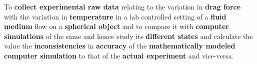 {To \textbf{collect experimental raw data} relating to the variation in \textbf{drag force} with the variation in \textbf{temperature} in a lab controlled setting of a \textbf{fluid medium} flow on a \textbf{spherical object} and to compare it with \textbf{computer simulations} of the same and hence study its \textbf{different states} and calculate the value the \textbf{inconsistencies} in \textbf{accuracy} of the \textbf{mathematically modeled computer simulation} to that of the \textbf{actual experiment} and vice-versa.}
